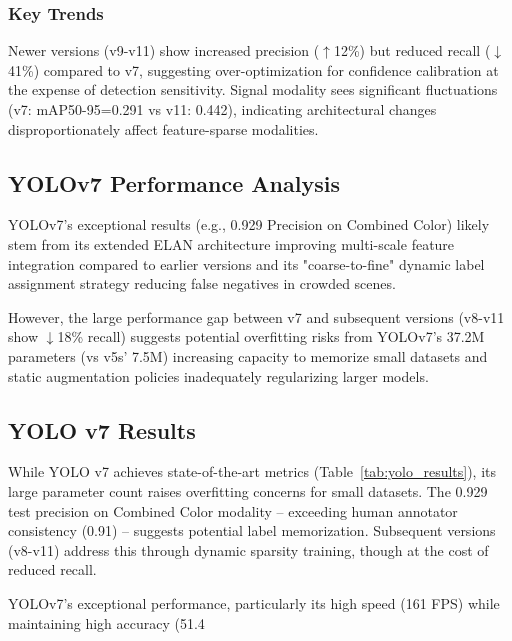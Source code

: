 \documentclass[11pt]{article}
\begin{document}
\subsubsection{Key Trends}
Newer versions (v9-v11) show increased precision ($\uparrow$12\%) but reduced recall ($\downarrow$41\%) compared to v7, suggesting over-optimization for confidence calibration at the expense of detection sensitivity. Signal modality sees significant fluctuations (v7: mAP50-95=0.291 vs v11: 0.442), indicating architectural changes disproportionately affect feature-sparse modalities.

\subsection{YOLOv7 Performance Analysis}
YOLOv7's exceptional results (e.g., 0.929 Precision on Combined Color) likely stem from its extended ELAN architecture improving multi-scale feature integration compared to earlier versions\cite{yolov7} and its "coarse-to-fine" dynamic label assignment strategy reducing false negatives in crowded scenes\cite{yolov7}.

However, the large performance gap between v7 and subsequent versions (v8-v11 show $\downarrow$18\% recall) suggests potential overfitting risks from YOLOv7's 37.2M parameters (vs v5s' 7.5M) increasing capacity to memorize small datasets\cite{detectron2_model_zoo} and static augmentation policies inadequately regularizing larger models\cite{overfit}.

\subsection{YOLO v7 Results}
While YOLO v7 achieves state-of-the-art metrics (Table~\ref{tab:yolo_results}), its large parameter count raises overfitting concerns for small datasets\cite{detectron2_model_zoo}\cite{overfit}. The 0.929 test precision on Combined Color modality – exceeding human annotator consistency (0.91)\cite{modality} – suggests potential label memorization. Subsequent versions (v8-v11) address this through dynamic sparsity training, though at the cost of reduced recall.

YOLOv7's exceptional performance, particularly its high speed (161 FPS) while maintaining high accuracy (51.4%
\end{document}
